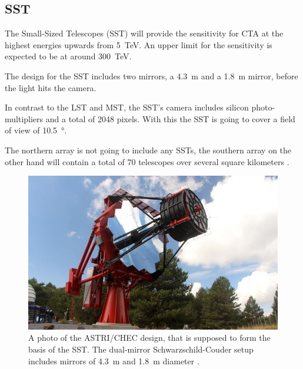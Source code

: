 \subsection{SST}

The Small-Sized Telescopes (SST) will provide the sensitivity for CTA at the 
highest energies upwards from \SI{5}{\tera\electronvolt}.
An upper limit for the sensitivity is expected to be at around \SI{300}{\tera\electronvolt}.

The design for the SST includes two mirrors, a \SI{4.3}{\meter} and a \SI{1.8}{\meter}
mirror, before the light hits the camera.

In contrast to the LST and MST, the SST's camera includes silicon photo-multipliers
and a total of 2048 pixels. With this the SST is going to cover a field of view 
of \SI{10.5}{\degree}.

The northern array is not going to include any SSTs, the 
southern array on the other hand will contain a total of 70 telescopes over
several square kilometers \cite{cta_web}.

\begin{figure}
		\centering
		\captionsetup{width=0.9\linewidth}
		\includegraphics[width=.8\textwidth]{images/sst.jpg}
		\caption{A photo of the ASTRI/CHEC design, that is supposed
		to form the basis of the SST.
		The dual-mirror Schwarzschild-Couder setup includes mirrors of
		\SI{4.3}{\meter} and \SI{1.8}{\meter} diameter \cite{cta_web}.}
		\label{fig:sst}
\end{figure}